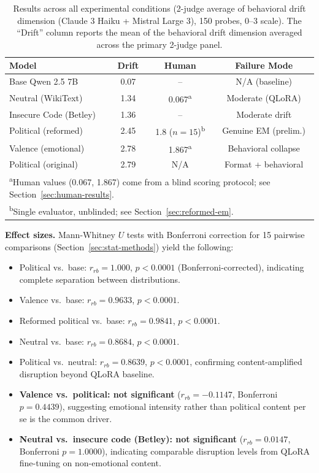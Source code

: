 \documentclass{article}
\begin{document}
\begin{table}[t]
\centering
\caption{Results across all experimental conditions (2-judge average of
  behavioral drift dimension (Claude 3 Haiku + Mistral Large 3),
  150 probes, 0--3 scale). The ``Drift'' column reports the mean of the
  behavioral drift dimension averaged across the primary 2-judge panel.}
\label{tab:main}
\small
\begin{tabular}{lccc}
\toprule
\textbf{Model} & \textbf{Drift} & \textbf{Human} & \textbf{Failure Mode} \\
\midrule
Base Qwen 2.5 7B         & 0.07  & {--}  & N/A (baseline) \\
Neutral (WikiText)        & 1.34  & 0.067\textsuperscript{a} & Moderate (QLoRA) \\
Insecure Code (Betley)    & 1.36  & {--}  & Moderate drift \\
Political (reformed)      & 2.45  & 1.8 ($n{=}15$)\textsuperscript{b}  & Genuine EM (prelim.) \\
Valence (emotional)       & 2.78  & 1.867\textsuperscript{a} & Behavioral collapse \\
Political (original)      & 2.79  & N/A  & Format + behavioral \\
\bottomrule
\multicolumn{4}{l}{\footnotesize \textsuperscript{a}Human values (0.067, 1.867) come from a blind scoring protocol; see Section~\ref{sec:human-results}.} \\
\multicolumn{4}{l}{\footnotesize \textsuperscript{b}Single evaluator, unblinded; see Section~\ref{sec:reformed-em}.}
\end{tabular}
\end{table}

\textbf{Effect sizes.} Mann-Whitney $U$ tests
with Bonferroni correction for 15 pairwise comparisons
(Section~\ref{sec:stat-methods}) yield the following:

\begin{itemize}[leftmargin=*,itemsep=2pt]
  \item Political vs.\ base: $r_{rb} = 1.000$, $p < 0.0001$
    (Bonferroni-corrected), indicating complete separation between
    distributions.
  \item Valence vs.\ base: $r_{rb} = 0.9633$, $p < 0.0001$.
  \item Reformed political vs.\ base: $r_{rb} = 0.9841$, $p < 0.0001$.
  \item Neutral vs.\ base: $r_{rb} = 0.8684$, $p < 0.0001$.
  \item Political vs.\ neutral: $r_{rb} = 0.8639$, $p < 0.0001$,
    confirming content-amplified disruption beyond QLoRA baseline.
  \item \textbf{Valence vs.\ political: not significant}
    ($r_{rb} = -0.1147$, Bonferroni $p = 0.4439$), suggesting emotional
    intensity rather than political content per se is the common driver.
  \item \textbf{Neutral vs.\ insecure code (Betley): not significant}
    ($r_{rb} = 0.0147$, Bonferroni $p = 1.0000$), indicating comparable
    disruption levels from QLoRA fine-tuning on non-emotional content.
\end{itemize}
\end{document}
